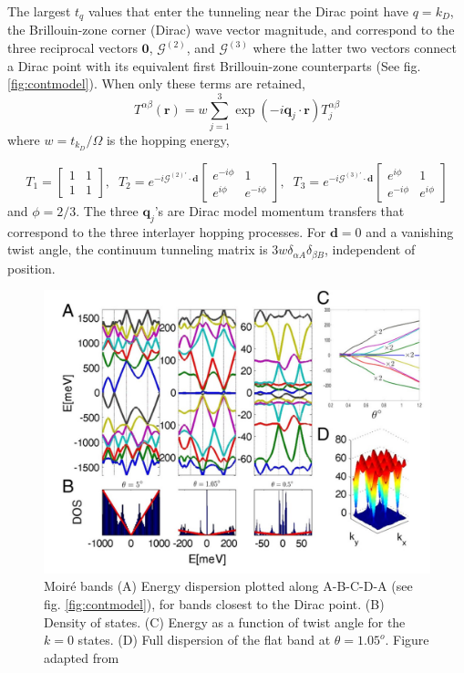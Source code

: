 The largest $t_q$ values that enter the tunneling near the Dirac point have $q=k_D$, the Brillouin-zone corner (Dirac) wave vector magnitude, and correspond to the three reciprocal vectors $\mathbf{0}$, $\mathcal{G}^{(2)}$, and $\mathcal{G}^{(3)}$ where the latter two vectors connect a Dirac point with its equivalent first Brillouin-zone counterparts (See fig. \ref{fig:contmodel}). When only these terms are retained,
\begin{equation}
	T^{\alpha \beta}(\mathbf{r})=w \sum_{j=1}^{3} \exp \left(-i \mathbf{q}_{j} \cdot \mathbf{r}\right) T_{j}^{\alpha \beta}
\end{equation}
where $w=t_{k_D}/\Omega$ is the hopping energy,

\begin{equation}
	T_1 = \begin{bmatrix}
		1 & 1 \\
		1 & 1
	\end{bmatrix}, \; \;
	T_2=e^{-i \mathcal{G}^{(2)\prime} \cdot \mathbf{d}} \begin{bmatrix}
		e^{-i \phi} & 1 \\ e^{i \phi} & e^{-i \phi}
	\end{bmatrix}, \; \;
	T_3=e^{-i \mathcal{G}^{(3)\prime} \cdot \mathbf{d}} \begin{bmatrix}
		e^{i \phi} & 1 \\ e^{-i \phi} & e^{i \phi}
	\end{bmatrix}
\end{equation}
and $\phi=2/3$. The three $\mathbf{q}_j$’s are Dirac model momentum transfers that correspond to the three interlayer hopping processes. For $\mathbf{d}=0$ and a vanishing twist angle, the continuum tunneling matrix is $3w\delta_{\alpha A}\delta_{\beta B}$, independent of position.

\begin{figure}[H]
	\centering
	\includegraphics[width=\textwidth]{figures/contmodelband.jpg}
	\caption{Moiré bands (A) Energy dispersion plotted along A-B-C-D-A (see fig. \ref{fig:contmodel}), for bands closest to the Dirac point. (B) Density of states. (C)  Energy as a function of twist angle for the $k=0$ states. (D) Full dispersion of the flat band at $\theta = 1.05^o$. Figure adapted from \cite{Bistritzer12233}}
	\label{fig:contmodelband}
\end{figure}

